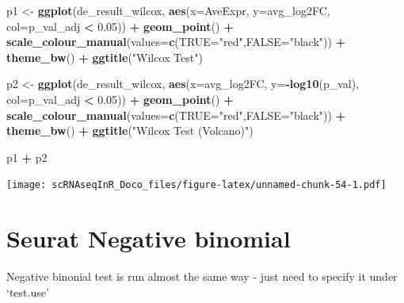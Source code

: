 \documentclass[
]{book}
\newenvironment{Shaded}{\begin{snugshade}}{\end{snugshade}}
\newcommand{\AttributeTok}[1]{\textcolor[rgb]{0.13,0.29,0.53}{#1}}
\newcommand{\FloatTok}[1]{\textcolor[rgb]{0.00,0.00,0.81}{#1}}
\newcommand{\FunctionTok}[1]{\textcolor[rgb]{0.13,0.29,0.53}{\textbf{#1}}}
\newcommand{\NormalTok}[1]{#1}
\newcommand{\OtherTok}[1]{\textcolor[rgb]{0.56,0.35,0.01}{#1}}
\newcommand{\SpecialCharTok}[1]{\textcolor[rgb]{0.81,0.36,0.00}{\textbf{#1}}}
\newcommand{\StringTok}[1]{\textcolor[rgb]{0.31,0.60,0.02}{#1}}
\begin{document}
\begin{Shaded}
\begin{Highlighting}[]
\NormalTok{p1 }\OtherTok{\textless{}{-}} \FunctionTok{ggplot}\NormalTok{(de\_result\_wilcox, }\FunctionTok{aes}\NormalTok{(}\AttributeTok{x=}\NormalTok{AveExpr, }\AttributeTok{y=}\NormalTok{avg\_log2FC, }\AttributeTok{col=}\NormalTok{p\_val\_adj }\SpecialCharTok{\textless{}} \FloatTok{0.05}\NormalTok{)) }\SpecialCharTok{+}
  \FunctionTok{geom\_point}\NormalTok{() }\SpecialCharTok{+}
  \FunctionTok{scale\_colour\_manual}\NormalTok{(}\AttributeTok{values=}\FunctionTok{c}\NormalTok{(}\StringTok{\textquotesingle{}TRUE\textquotesingle{}}\OtherTok{=}\StringTok{"red"}\NormalTok{,}\StringTok{\textquotesingle{}FALSE\textquotesingle{}}\OtherTok{=}\StringTok{"black"}\NormalTok{)) }\SpecialCharTok{+} 
  \FunctionTok{theme\_bw}\NormalTok{() }\SpecialCharTok{+}
  \FunctionTok{ggtitle}\NormalTok{(}\StringTok{"Wilcox Test"}\NormalTok{)}


\NormalTok{p2 }\OtherTok{\textless{}{-}} \FunctionTok{ggplot}\NormalTok{(de\_result\_wilcox, }\FunctionTok{aes}\NormalTok{(}\AttributeTok{x=}\NormalTok{avg\_log2FC, }\AttributeTok{y=}\SpecialCharTok{{-}}\FunctionTok{log10}\NormalTok{(p\_val), }\AttributeTok{col=}\NormalTok{p\_val\_adj }\SpecialCharTok{\textless{}} \FloatTok{0.05}\NormalTok{)) }\SpecialCharTok{+}
  \FunctionTok{geom\_point}\NormalTok{() }\SpecialCharTok{+}
  \FunctionTok{scale\_colour\_manual}\NormalTok{(}\AttributeTok{values=}\FunctionTok{c}\NormalTok{(}\StringTok{\textquotesingle{}TRUE\textquotesingle{}}\OtherTok{=}\StringTok{"red"}\NormalTok{,}\StringTok{\textquotesingle{}FALSE\textquotesingle{}}\OtherTok{=}\StringTok{"black"}\NormalTok{)) }\SpecialCharTok{+} 
  \FunctionTok{theme\_bw}\NormalTok{() }\SpecialCharTok{+}
  \FunctionTok{ggtitle}\NormalTok{(}\StringTok{"Wilcox Test (Volcano)"}\NormalTok{)}

\NormalTok{p1 }\SpecialCharTok{+}\NormalTok{ p2}
\end{Highlighting}
\end{Shaded}

\texttt{[image: scRNAseqInR\_Doco\_files/figure-latex/unnamed-chunk-54-1.pdf]}

\hypertarget{seurat-negative-binomial}{%
\section{Seurat Negative binomial}\label{seurat-negative-binomial}}

Negative binonial test is run almost the same way - just need to specify it under `test.use'
\end{document}
